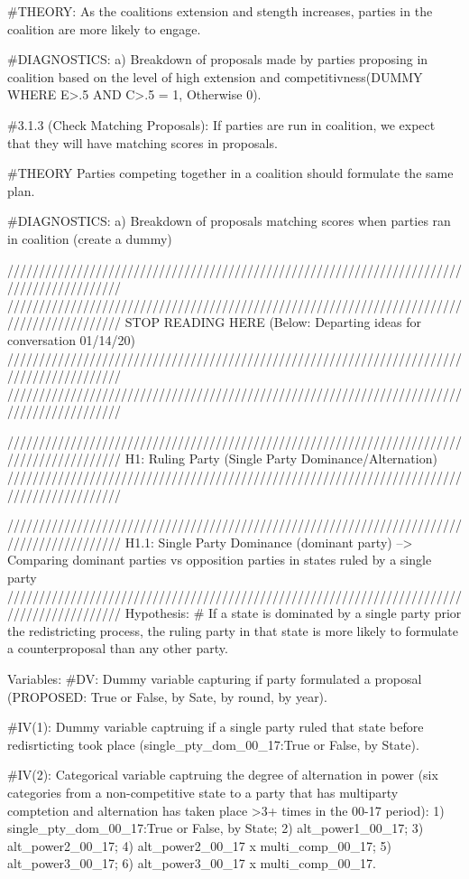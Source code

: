 \documentclass[
]{article}
\begin{document}
\#THEORY: As the coalitions extension and stength increases, parties in
the coalition are more likely to engage.

\#DIAGNOSTICS: a) Breakdown of proposals made by parties proposing in
coalition based on the level of high extension and competitivness(DUMMY
WHERE E\textgreater.5 AND C\textgreater.5 = 1, Otherwise 0).

\#3.1.3 (Check Matching Proposals): If parties are run in coalition, we
expect that they will have matching scores in proposals.

\#THEORY Parties competing together in a coalition should formulate the
same plan.

\#DIAGNOSTICS: a) Breakdown of proposals matching scores when parties
ran in coalition (create a dummy)

//////////////////////////////////////////////////////////////////////////////////////////
//////////////////////////////////////////////////////////////////////////////////////////
STOP READING HERE (Below: Departing ideas for conversation 01/14/20)
//////////////////////////////////////////////////////////////////////////////////////////
//////////////////////////////////////////////////////////////////////////////////////////

//////////////////////////////////////////////////////////////////////////////////////////
H1: Ruling Party (Single Party Dominance/Alternation)
//////////////////////////////////////////////////////////////////////////////////////////

//////////////////////////////////////////////////////////////////////////////////////////
H1.1: Single Party Dominance (dominant party) --\textgreater{} Comparing
dominant parties vs opposition parties in states ruled by a single party
//////////////////////////////////////////////////////////////////////////////////////////
Hypothesis: \# If a state is dominated by a single party prior the
redistricting process, the ruling party in that state is more likely to
formulate a counterproposal than any other party.

Variables: \#DV: Dummy variable capturing if party formulated a proposal
(PROPOSED: True or False, by Sate, by round, by year).

\#IV(1): Dummy variable captruing if a single party ruled that state
before redisrticting took place (single\_pty\_dom\_00\_17:True or False,
by State).

\#IV(2): Categorical variable captruing the degree of alternation in
power (six categories from a non-competitive state to a party that has
multiparty comptetion and alternation has taken place \textgreater3+
times in the 00-17 period): 1) single\_pty\_dom\_00\_17:True or False,
by State; 2) alt\_power1\_00\_17; 3) alt\_power2\_00\_17; 4)
alt\_power2\_00\_17 x multi\_comp\_00\_17; 5) alt\_power3\_00\_17; 6)
alt\_power3\_00\_17 x multi\_comp\_00\_17.
\end{document}
